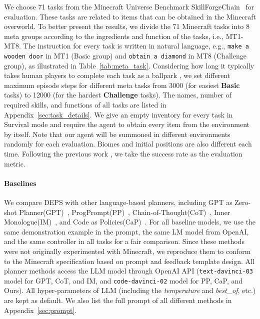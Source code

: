 \documentclass{article}
\begin{document}
We choose 71 tasks from the Minecraft Universe Benchmark SkillForgeChain~\cite{mcu} for evaluation. These tasks are related to items that can be obtained in the Minecraft overworld.
To better present the results, we divide the 71 Minecraft tasks into 8 meta groups according to the ingredients and function of the tasks, i.e., MT1-MT8. The instruction for every task is written in natural language, e.g., \texttt{make a  wooden door} in MT1 (Basic group) and \texttt{obtain a diamond} in MT8 (Challenge group), as illustrated in Table~\ref{tab:meta_task}.
Considering how long it typically takes human players to complete each task as a ballpark \cite{minerl}, we set different maximum episode steps for different meta tasks from 3000 (for easiest \textbf{Basic} tasks) to 12000 (for the hardest \textbf{Challenge} tasks).
The names, number of required skills, and functions of all tasks are listed in Appendix~\ref{sec:task_details}. 
We give an empty inventory for every task in Survival mode and require the agent to obtain every item from the environment by itself.
Note that our agent will be summoned in different environments randomly for each evaluation. Biomes and initial positions are also different each time.
Following the previous work \cite{malmo}, we take the success rate as the evaluation metric.

\paragraph{Baselines} We compare DEPS with other language-based planners, including GPT as Zero-shot Planner(GPT)~\cite{huang2022language}, ProgPrompt(PP)~\cite{progprompt}, Chain-of-Thought(CoT)~\cite{chainofthought}, Inner Monologue(IM)~\cite{innermonologue}, and Code as Policies(CaP)~\cite{codeaspolicies}. For all baseline models, we use the same demonstration example in the prompt, the same LM model from OpenAI, and the same controller in all tasks for a fair comparison. 
Since these methods were not originally experimented with Minecraft, we reproduce them to conform to the Minecraft specification based on prompt and feedback template design.
All planner methods access the LLM model through OpenAI API (\texttt{text-davinci-03} model \cite{instructGPT} for GPT, CoT, and IM, and \texttt{code-davinci-02} model \cite{codex} for PP, CaP, and Ours). All hyper-parameters of LLM (including the \textit{temperature} and \textit{best\_of}, etc.) are kept as default. We also list the full prompt of all different methods in Appendix~\ref{sec:prompt}.
\end{document}
